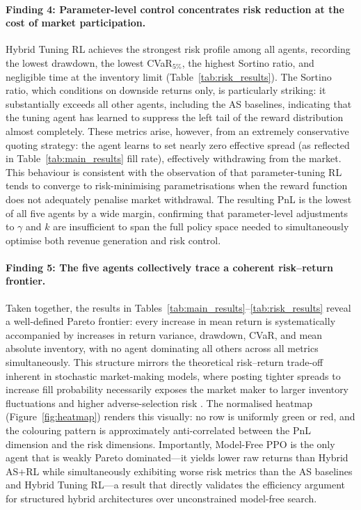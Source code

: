 \documentclass[11pt]{article}
\begin{document}
\paragraph{Finding 4: Parameter-level control concentrates risk reduction
  at the cost of market participation.}
Hybrid Tuning RL achieves the strongest risk profile among all agents,
recording the lowest drawdown, the lowest CVaR$_{5\%}$, the highest
Sortino ratio, and negligible time at the inventory limit
(Table~\ref{tab:risk_results}).
The Sortino ratio, which conditions on downside returns only, is
particularly striking: it substantially exceeds all other agents,
including the AS baselines, indicating that the tuning agent has
learned to suppress the left tail of the reward distribution almost
completely.
These metrics arise, however, from an extremely conservative quoting
strategy: the agent learns to set nearly zero effective spread (as
reflected in Table~\ref{tab:main_results} fill rate), effectively
withdrawing from the market.
This behaviour is consistent with the observation of \textcite{falces2022asrl}
that parameter-tuning RL tends to converge to risk-minimising
parametrisations when the reward function does not adequately penalise
market withdrawal.
The resulting PnL is the lowest of all five agents by a wide margin,
confirming that parameter-level adjustments to $\gamma$ and $k$ are
insufficient to span the full policy space needed to simultaneously
optimise both revenue generation and risk control.

\paragraph{Finding 5: The five agents collectively trace a coherent
  risk--return frontier.}
Taken together, the results in Tables~\ref{tab:main_results}--\ref{tab:risk_results}
reveal a well-defined Pareto frontier: every increase in mean return
is systematically accompanied by increases in return variance, drawdown,
CVaR, and mean absolute inventory, with no agent dominating all others
across all metrics simultaneously.
This structure mirrors the theoretical risk--return trade-off inherent
in stochastic market-making models, where posting tighter spreads to
increase fill probability necessarily exposes the market maker to larger
inventory fluctuations and higher adverse-selection risk
\parencite{ho1981dealer,stoikov2009option,cont2010stochastic}.
The normalised heatmap (Figure~\ref{fig:heatmap}) renders this visually:
no row is uniformly green or red, and the colouring pattern is
approximately anti-correlated between the PnL dimension and the risk
dimensions.
Importantly, Model-Free PPO is the only agent that is weakly Pareto
dominated---it yields lower raw returns than Hybrid AS+RL while
simultaneously exhibiting worse risk metrics than the AS baselines and
Hybrid Tuning RL---a result that directly validates the efficiency
argument for structured hybrid architectures over unconstrained
model-free search.
\end{document}
